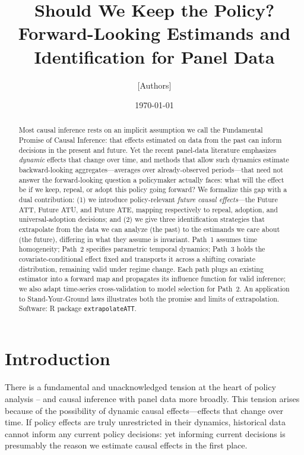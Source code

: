 \documentclass{article}
\title{Should We Keep the Policy? Forward-Looking Estimands and Identification for Panel Data}
\author{[Authors]}
\date{\today}
\begin{document}
\maketitle

\begin{abstract}
Most causal inference rests on an implicit assumption we call the Fundamental Promise of Causal Inference: that effects estimated on data from the past can inform decisions in the present and future. Yet the recent panel-data literature emphasizes \emph{dynamic} effects that change over time, and methods that allow such dynamics estimate backward-looking aggregates---averages over already-observed periods---that need not answer the forward-looking question a policymaker actually faces: what will the effect be if we keep, repeal, or adopt this policy going forward? We formalize this gap with a dual contribution: (1) we introduce policy-relevant \emph{future causal effects}---the Future ATT, Future ATU, and Future ATE, mapping respectively to repeal, adoption, and universal-adoption decisions; and (2) we give three identification strategies that extrapolate from the data we can analyze (the past) to the estimands we care about (the future), differing in what they assume is invariant. Path~1 assumes time homogeneity; Path~2 specifies parametric temporal dynamics; Path~3 holds the covariate-conditional effect fixed and transports it across a shifting covariate distribution, remaining valid under regime change. Each path plugs an existing estimator into a forward map and propagates its influence function for valid inference; we also adapt time-series cross-validation to model selection for Path~2. An application to Stand-Your-Ground laws illustrates both the promise and limits of extrapolation. Software: R package \texttt{extrapolateATT}.
\end{abstract}

\section{Introduction}
\label{sec:intro}


There is a fundamental and unacknowledged tension at the heart of policy analysis\citep{egamiElementsExternalValidity2023,heckmanPolicyRelevantTreatmentEffects2001} -- and causal inference with panel data more broadly. This tension arises because of the possibility of dynamic causal effects---effects that change over time. If policy effects are truly unrestricted in their dynamics, historical data cannot inform any current policy decisions: yet informing current decisions is presumably the reason we estimate causal effects in the first place.
\end{document}
